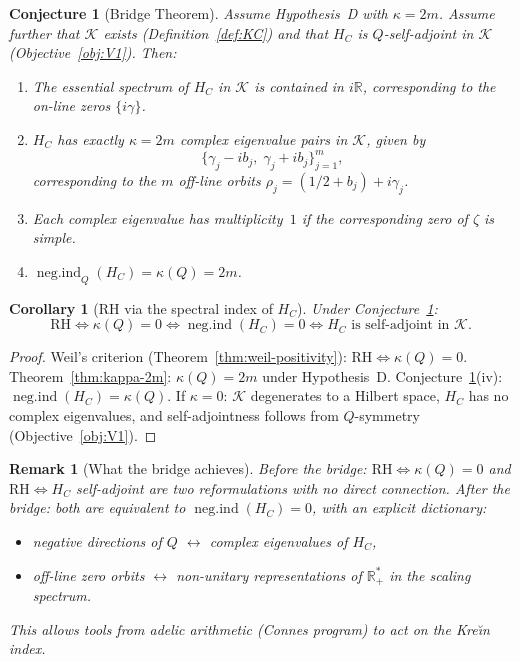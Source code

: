 \documentclass[11pt]{amsart}
\newtheorem{corollary}[theorem]{Corollary}
\newtheorem{remark}[theorem]{Remark}
\newtheorem{conjecture}[theorem]{Conjecture}
\newcommand{\kap}{\kappa}
\newcommand{\negind}{\operatorname{neg.ind}}
\newcommand{\Kcal}{\mathcal{K}}
\begin{document}
\begin{conjecture}[Bridge Theorem]\label{conj:bridge}
Assume Hypothesis~D with $\kap = 2m$.  Assume further that $\Kcal$ exists
(Definition~\ref{def:KC}) and that $H_C$ is $Q$-self-adjoint in $\Kcal$ (Objective~\ref{obj:V1}).
Then:
\begin{enumerate}
\item[\emph{(i)}] The essential spectrum of $H_C$ in $\Kcal$ is contained in $i\mathbb{R}$,
  corresponding to the on-line zeros $\{i\gamma\}$.
\item[\emph{(ii)}] $H_C$ has exactly $\kap = 2m$ complex eigenvalue pairs in $\Kcal$, given by
  \[
    \{\gamma_j - ib_j,\;\gamma_j + ib_j\}_{j=1}^m,
  \]
  corresponding to the $m$ off-line orbits $\rho_j = (1/2+b_j)+i\gamma_j$.
\item[\emph{(iii)}] Each complex eigenvalue has multiplicity~$1$ if the corresponding zero
  of $\zeta$ is simple.
\item[\emph{(iv)}] $\negind_Q(H_C) = \kap(Q) = 2m$.
\end{enumerate}
\end{conjecture}

\begin{corollary}[RH via the spectral index of $H_C$]\label{cor:rh-hc}
Under Conjecture~\ref{conj:bridge}:
\[
  \mathrm{RH}
  \iff \kap(Q) = 0
  \iff \negind(H_C) = 0
  \iff H_C \text{ is self-adjoint in } \Kcal.
\]
\end{corollary}

\begin{proof}
Weil's criterion (Theorem~\ref{thm:weil-positivity}): $\mathrm{RH} \iff \kap(Q) = 0$.
Theorem~\ref{thm:kappa-2m}: $\kap(Q) = 2m$ under Hypothesis~D.
Conjecture~\ref{conj:bridge}(iv): $\negind(H_C) = \kap(Q)$.
If $\kap = 0$: $\Kcal$ degenerates to a Hilbert space, $H_C$ has no complex eigenvalues,
and self-adjointness follows from $Q$-symmetry (Objective~\ref{obj:V1}).
\end{proof}

\begin{remark}[What the bridge achieves]\label{rem:bridge-value}
Before the bridge: $\mathrm{RH} \iff \kap(Q)=0$ and $\mathrm{RH} \iff H_C$
self-adjoint are two reformulations with no direct connection.
After the bridge: both are equivalent to $\negind(H_C) = 0$, with an explicit dictionary:
\begin{itemize}
\item negative directions of $Q$ $\longleftrightarrow$ complex eigenvalues of $H_C$,
\item off-line zero orbits $\longleftrightarrow$ non-unitary representations of $\mathbb{R}^*_+$
  in the scaling spectrum.
\end{itemize}
This allows tools from adelic arithmetic (Connes program) to act on the Kre\u{\i}n index.
\end{remark}
\end{document}
